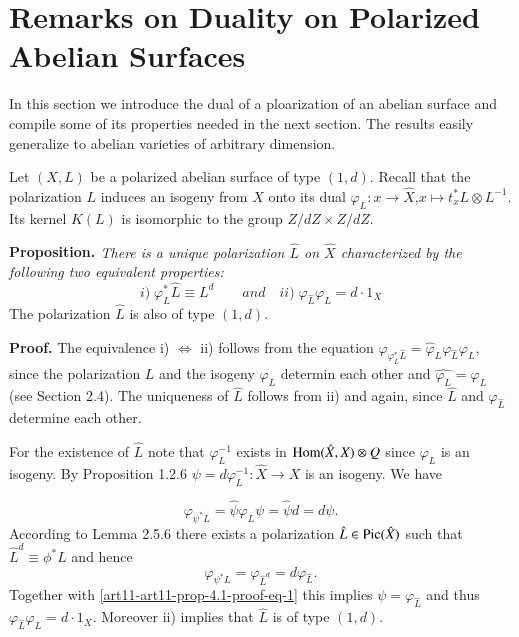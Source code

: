 \section{Remarks on Duality on Polarized Abelian Surfaces} \label{art11-sec-4}

In this section we introduce the dual of a ploarization of an abelian surface and compile some of its properties needed in the next section. The results easily generalize to abelian varieties of arbitrary dimension.

Let $(X, L)$ be a polarized abelian surface of type $(1,d)$. Recall that the polarization $L$ induces an isogeny from $X$ onto its dual $\varphi_{L}: x\rightarrow \widehat{X}$,$ x \mapsto t_{x}^{*}L \otimes L^{-1}$. Its kernel $K(L)$ is isomorphic to the group $Z/dZ \times Z/dZ$.

\medskip
\noindent
{\bfseries {} Proposition. \label{art11-prop-4.1}} \textit{There is a unique polarization $\hat{L}$ on $\hat{X}$ characterized by the following two equivalent properties:}
$$
i)\; \varphi_{L}^{*}\hat{L} \equiv L^{d} \qquad  and \quad ii)\; \varphi_{\hat{L}}\varphi_{L}=d \cdot 1_{X}
$$ 
The polarization $\hat{L}$ is also of type $(1,d)$.

\medskip
\noindent
{\bfseries Proof.} The equivalence i) $\Longleftrightarrow $ ii) follows from the equation
 $\varphi_{\varphi_{L}^{*} \hat{L}} = \hat{\varphi}_{L}\varphi_{\hat{L}}\varphi_{L}$, since the polarization $L$ and the isogeny $\varphi_{L}$ determin each other and $\hat{\varphi_{L}} = \varphi_{L}$ (see \cite{art11-keyL-B} Section 2.4). The uniqueness of $\hat{L}$ follows from ii) and again, since $\hat{L}$ and $ \varphi_{\hat{L}}$ determine each other.
 
 For the existence of $\hat{L}$ note that $\varphi_{L}^{-1}$ exists in $\operatorname{Hom}(\hat{X}, X) \otimes Q$ since $\varphi_{L}$ is an isogeny. By \cite{art11-keyL-B} Proposition 1.2.6 $\psi =d\varphi_{L}^{-1} : \hat{X} \rightarrow X$ is an isogeny. We have

\setcounter{equation}{0} 
\begin{equation}\label{art11-art11-prop-4.1-proof-eq-1}
\varphi_{\psi^{*}L} = \hat{\psi}\varphi_{L}\psi = \hat{\psi}d = d\psi.
\end{equation}
According to \cite{art11-keyL-B} Lemma 2.5.6 there exists a polarization $\hat{L} \in \operatorname{Pic}(\hat{X})$ such that
$\hat{L}^{d} \equiv \phi^{*}L$ and hence
$$
\varphi_{\psi^{*}L}=\varphi_{\hat{L}^{d}} =d\varphi_{\hat{L}}.
$$
Together with \eqref{art11-art11-prop-4.1-proof-eq-1} this implies $\psi = \varphi_{\hat{L}}$ and thus $\varphi_{\hat{L}}\varphi_{L} =d \cdot 1_{X}$. Moreover ii) implies that $\hat{L}$ is of type $(1,d)$.

